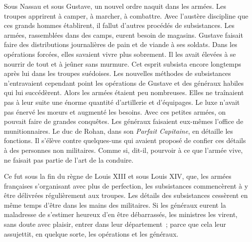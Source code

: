 \documentclass[french,twoside]{book} %
\begin{document}
Sous Nassau et sous Gustave, un nouvel ordre naquit dans les armées. Les troupes apprirent à camper, à marcher, à combattre. Avec l’austère discipline que ces grands hommes établirent, il fallut d’autres procédés de subsistances. Les armées, rassemblées dans des camps, eurent besoin de magasins. Gustave faisait faire des distributions journalières de pain et de viande à ses soldats. Dans les opérations forcées, elles savaient vivre plus sobrement. Il les avait élevées à se nourrir de tout et à jeûner sans murmure. Cet esprit subsista encore longtemps après lui dans les troupes suédoises. Les nouvelles méthodes de subsistances n’entravaient cependant point les opérations de Gustave et des généraux habiles qui lui succédèrent. Alors les armées étaient peu nombreuses. Elles ne traînaient pas à leur suite une énorme quantité d’artillerie et d’équipages. Le luxe n’avait pas énervé les mœurs et augmenté les besoins. Avec ces petites armées, on pouvait faire de grandes conquêtes. Les généraux faisaient eux-mêmes l’office de munitionnaires. Le duc de Rohan, dans son {\itshape Parfait Capitaine}, en détaille les fonctions. Il s’élève contre quelques-uns qui avaient proposé de confier ces détails à des personnes non militaires. Comme si, dit-il, pourvoir à ce que l’armée vive, ne faisait pas partie de l’art de la conduire.\par
Ce fut sous la fin du règne de Louis XIII et sous Louis XIV, que, les armées françaises s’organisant avec plus de perfection, les subsistances commencèrent à y être délivrées régulièrement aux troupes. Les détails des subsistances cessèrent en même temps d’être dans les mains des militaires. Si les généraux eurent la maladresse de s’estimer heureux d’en être débarrassés, les ministres les virent, sans doute avec plaisir, entrer dans leur département ; parce que cela leur assujettit, en quelque sorte, les opérations et les généraux.\par
\end{document}

